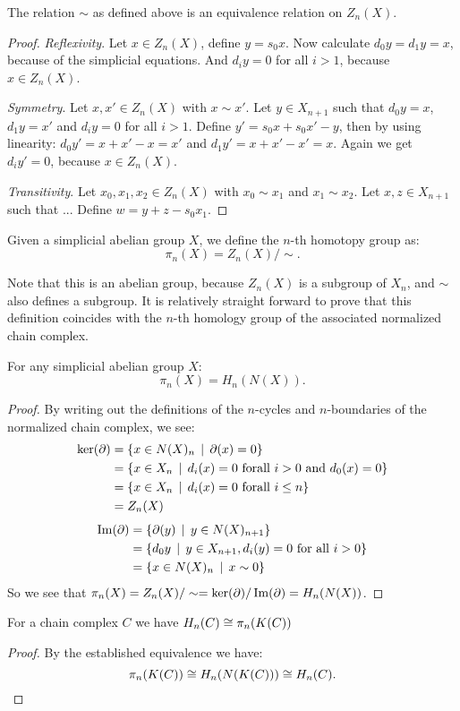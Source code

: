 
\begin{lemma}
	The relation $\sim$ as defined above is an equivalence relation on $Z_n(X)$.
\end{lemma}
\begin{proof}
	\emph{Reflexivity}. Let $x \in Z_n(X)$, define $y = s_0 x$. Now calculate $d_0 y = d_1 y = x$, because of the simplicial equations. And $d_i y = 0$ for all $i > 1$, because $x \in Z_n(X)$.

	\emph{Symmetry}. Let $x, x' \in Z_n(X)$ with $x \sim x'$. Let $y \in X_{n+1}$ such that $d_0 y = x$, $d_1 y = x'$ and $d_i y = 0$ for all $i > 1$. Define $y' = s_0 x + s_0 x' - y$, then by using linearity: $d_0 y' = x + x' - x = x'$ and $d_1 y' = x + x' - x' = x$. Again we get $d_i y' = 0$, because $x \in Z_n(X)$.

	\emph{Transitivity}. Let $x_0, x_1, x_2 \in Z_n(X)$ with $x_0 \sim x_1$ and $x_1 \sim x_2$. Let $x, z \in X_{n+1}$ such that ... Define $w = y + z - s_0 x_1$.
\end{proof}

\begin{definition}
	Given a simplicial abelian group $X$, we define the $n$-th homotopy group as:
	$$ \pi_n(X) = Z_n(X) / \sim. $$
\end{definition}

Note that this is an abelian group, because $Z_n(X)$ is a subgroup of $X_n$, and $\sim$ also defines a subgroup. It is relatively straight forward to prove that this definition coincides with the $n$-th homology group of the associated normalized chain complex.

\begin{lemma}
	For any simplicial abelian group $X$:
	$$ \pi_n(X) = H_n(N(X)). $$
\end{lemma}
\begin{proof}
	By writing out the definitions of the $n$-cycles and $n$-boundaries of the normalized chain complex, we see:
	\begin{align*}
		\ker(\partial) &= \{ x \in N(X)_n \,\mid\, \partial(x) = 0 \} \\
			&= \{ x \in X_n \,\mid\, d_i(x) = 0 \text{ forall } i > 0 \text{ and } d_0(x) = 0 \} \\
			&= \{ x \in X_n \,\mid\, d_i(x) = 0 \text{ forall } i \leq n \} \\
			&= Z_n(X)
	\end{align*}
	\begin{align*}
		\operatorname{Im}(\partial) &= \{ \partial(y) \,\mid\, y \in N(X)_{n+1} \} \\
			&= \{ d_0 y \,\mid\, y \in X_{n+1}, d_i(y) = 0 \text{ for all } i > 0 \} \\
			&= \{ x \in N(X)_n \,\mid\, x \sim 0 \}
	\end{align*}
	So we see that $\pi_n(X) = Z_n(X) / \sim = \ker(\partial) / \operatorname{Im}(\partial) = H_n(N(X))$.
\end{proof}

\begin{corollary}
	For a chain complex $C$ we have $H_n(C) \cong \pi_n(K(C))$
\end{corollary}
\begin{proof}
	By the established equivalence we have:
	$$ \pi_n(K(C)) \cong H_n(N(K(C))) \cong H_n(C). $$
\end{proof}


